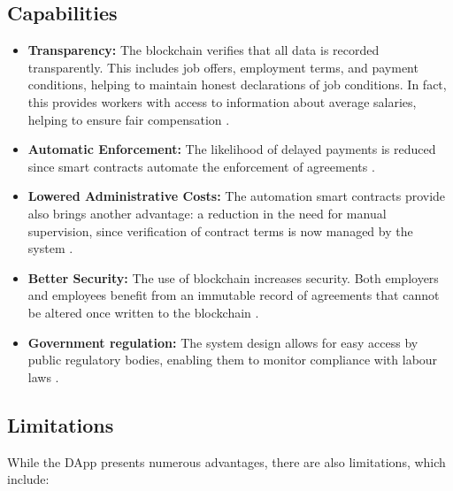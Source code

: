 \subsection{Capabilities}

\begin{itemize}
    \item \textbf{Transparency:} The blockchain verifies that all data is recorded transparently. This includes job offers, employment terms, and payment conditions, helping to maintain honest declarations of job conditions. In fact, this provides workers with access to information about average salaries, helping to ensure fair compensation \cite{lallaiETAL2020software}.
    \item \textbf{Automatic Enforcement:} The likelihood of delayed payments is reduced since smart contracts automate the enforcement of agreements \cite{lallaiETAL2020software}.
    \item \textbf{Lowered Administrative Costs:} The automation smart contracts provide also brings another advantage: a reduction in the need for manual supervision, since verification of contract terms is now managed by the system \cite{lallaiETAL2020software}.
    \item \textbf{Better Security:} The use of blockchain increases security. Both employers and employees benefit from an immutable record of agreements that cannot be altered once written to the blockchain \cite{lallaiETAL2020software}.
    \item \textbf{Government regulation:} The system design allows for easy access by public regulatory bodies, enabling them to monitor compliance with labour laws \cite{lallaiETAL2020software}.
\end{itemize}

\subsection{Limitations}

While the DApp presents numerous advantages, there are also limitations, which include:

